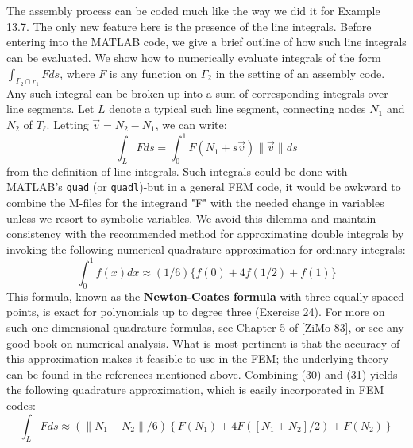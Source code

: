 \documentclass[../main.tex]{subfiles}
\begin{document}
\\
\\
The assembly process can be coded much like the way we did it for Example 13.7. The only new feature here is the presence of the line integrals. Before entering into the MATLAB code, we give a brief outline of how such line integrals can be evaluated. We show how to numerically evaluate integrals of the form $\int_{\Gamma_{2} \cap r_{1}} F d s$, where $F$ is any function on $\Gamma_{2}$ in the setting of an assembly code. Any such integral can be broken up into a sum of corresponding integrals over line segments. Let $L$ denote a typical such line segment, connecting nodes $N_{1}$ and $N_{2}$ of $T_{\ell}$. Letting $\vec{v}=N_{2}-N_{1}$, we can write:
\begin{equation}
\int_{L} F d s=\int_{0}^{1} F\left(N_{1}+s \vec{v}\right)\|\vec{v}\| d s
\end{equation}
from the definition of line integrals. Such integrals could be done with 
MATLAB's \texttt{quad} (or \texttt{quadl})-but in a general FEM code, it would be awkward to combine the M-files for the integrand "F" with the needed change in variables 
unless we resort to symbolic variables. We avoid this dilemma and maintain 
consistency with the recommended method for approximating double integrals by 
invoking the following numerical quadrature approximation for ordinary integrals:
\begin{equation}
\int_{0}^{1} f(x) d x \approx(1 / 6)\{f(0)+4 f(1 / 2)+f(1)\}
\end{equation}
This formula, known as the \textbf{Newton-Coates formula} with three equally spaced 
points, is exact for polynomials up to degree three (Exercise 24). For more on 
such one-dimensional quadrature formulas, see Chapter 5 of [ZiMo-83], or see any 
good book on numerical analysis. What is most pertinent is that the accuracy of 
this approximation makes it feasible to use in the FEM; the underlying theory can 
be found in the references mentioned above. Combining (30) and (31) yields the 
following quadrature approximation, which is easily incorporated in FEM codes: 
\begin{equation}
\int_{L} F d s \approx\left(\left\|N_{1}-N_{2}\right\| / 6\right)\left\{F\left(N_{1}\right)+4 F\left(\left[N_{1}+N_{2}\right] / 2\right)+F\left(N_{2}\right)\right\}
\end{equation}
\end{document}
